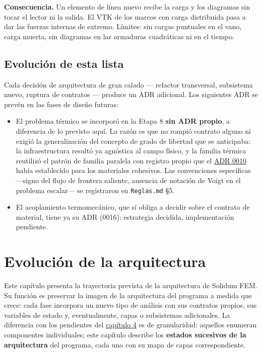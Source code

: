 \documentclass[11pt,oneside]{report}
\begin{document}
\textbf{Consecuencia.} Un elemento de línea nuevo recibe la carga y los diagramas sin tocar el lector ni la salida. El VTK de los marcos con carga distribuida pasa a dar las fuerzas internas de extremo. Límites: sin cargas puntuales en el vano, carga muerta, sin diagramas en las armaduras cuadráticas ni en el tiempo.

\section{Evolución de esta lista}

Cada decisión de arquitectura de gran calado --- refactor transversal, subsistema nuevo, ruptura de contratos --- produce un ADR adicional. Los siguientes ADR se prevén en las fases de diseño futuras:

\begin{itemize}
  \item El problema térmico se incorporó en la Etapa 8 \textbf{sin ADR propio}, a diferencia de lo previsto aquí. La razón es que no rompió contrato alguno ni exigió la generalización del concepto de grado de libertad que se anticipaba: la infraestructura resultó ya agnóstica al campo físico, y la familia térmica reutilizó el patrón de familia paralela con registro propio que el \hyperref[adr:0010]{ADR 0010} había establecido para los materiales cohesivos. Las convenciones específicas ---signo del flujo de frontera saliente, ausencia de notación de Voigt en el problema escalar--- se registraron en \texttt{Reglas.md} §5.
  \item El acoplamiento termomecánico, que sí obliga a decidir sobre el contrato de material, tiene ya su ADR (0016): estrategia decidida, implementación pendiente.
\end{itemize}


\newpage

\chapter{Evolución de la arquitectura}
\label{cap:9}



Este capítulo presenta la trayectoria prevista de la arquitectura de Solidum FEM. Su función es preservar la imagen de la arquitectura del programa a medida que crece: cada fase incorpora un nuevo tipo de análisis con sus contratos propios, sus variables de estado y, eventualmente, capas o subsistemas adicionales. La diferencia con los pendientes del \hyperref[cap:4]{capítulo 4} es de granularidad: aquellos enumeran componentes individuales; este capítulo describe los \textbf{estados sucesivos de la arquitectura} del programa, cada uno con su mapa de capas correspondiente.
\end{document}
